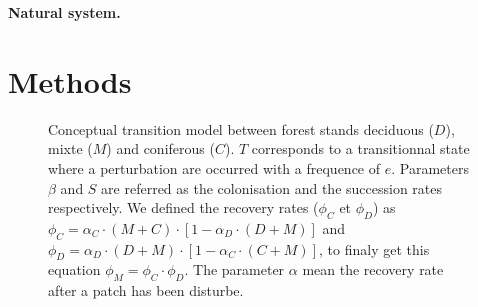 \textbf{Natural system.} 



\section{Methods}   

\begin{figure}
		
		\caption{Conceptual transition model between forest stands deciduous ($D$), mixte ($M$) and coniferous ($C$). $T$ corresponds to a transitionnal state where a perturbation are occurred with a frequence of $e$. Parameters $\beta$ and $S$ are referred as the colonisation and the succession rates respectively. We defined the recovery rates ($\phi_C$ et $\phi_D$) as $\phi_C = \alpha_C \cdot (M+C) \cdot [1- \alpha_D \cdot (D +M)]$ and $\phi_D = \alpha_D \cdot (D+M) \cdot [1- \alpha_C \cdot (C +M)]$, to finaly get this equation $\phi_M = \phi_C \cdot \phi_D$. The parameter $\alpha$ mean the recovery rate after a patch has been disturbe.}
		\label{Model}
\end{figure}

